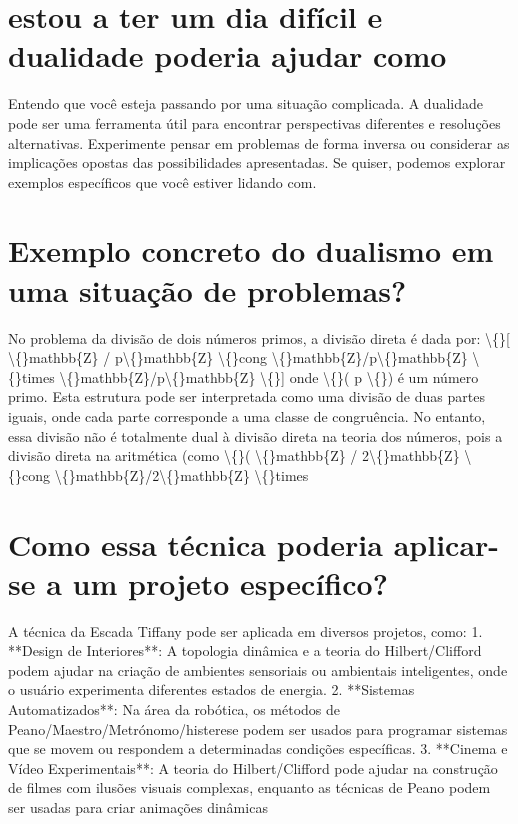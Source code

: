\documentclass[11pt,a4paper]{article}
\begin{document}
\section{estou a ter um dia difícil e dualidade poderia ajudar como}
Entendo que você esteja passando por uma situação complicada. A dualidade pode ser uma ferramenta útil para encontrar perspectivas diferentes e resoluções alternativas. Experimente pensar em problemas de forma inversa ou considerar as implicações opostas das possibilidades apresentadas. Se quiser, podemos explorar exemplos específicos que você estiver lidando com.

\section{Exemplo concreto do dualismo em uma situação de problemas?}
No problema da divisão de dois números primos, a divisão direta é dada por: \textbackslash\{\}[ \textbackslash\{\}mathbb\{Z\} / p\textbackslash\{\}mathbb\{Z\} \textbackslash\{\}cong \textbackslash\{\}mathbb\{Z\}/p\textbackslash\{\}mathbb\{Z\} \textbackslash\{\}times \textbackslash\{\}mathbb\{Z\}/p\textbackslash\{\}mathbb\{Z\} \textbackslash\{\}] onde \textbackslash\{\}( p \textbackslash\{\}) é um número primo. Esta estrutura pode ser interpretada como uma divisão de duas partes iguais, onde cada parte corresponde a uma classe de congruência. No entanto, essa divisão não é totalmente dual à divisão direta na teoria dos números, pois a divisão direta na aritmética (como \textbackslash\{\}( \textbackslash\{\}mathbb\{Z\} / 2\textbackslash\{\}mathbb\{Z\} \textbackslash\{\}cong \textbackslash\{\}mathbb\{Z\}/2\textbackslash\{\}mathbb\{Z\} \textbackslash\{\}times

\section{Como essa técnica poderia aplicar-se a um projeto específico?}
A técnica da Escada Tiffany pode ser aplicada em diversos projetos, como: 1. **Design de Interiores**: A topologia dinâmica e a teoria do Hilbert/Clifford podem ajudar na criação de ambientes sensoriais ou ambientais inteligentes, onde o usuário experimenta diferentes estados de energia. 2. **Sistemas Automatizados**: Na área da robótica, os métodos de Peano/Maestro/Metrónomo/histerese podem ser usados para programar sistemas que se movem ou respondem a determinadas condições específicas. 3. **Cinema e Vídeo Experimentais**: A teoria do Hilbert/Clifford pode ajudar na construção de filmes com ilusões visuais complexas, enquanto as técnicas de Peano podem ser usadas para criar animações dinâmicas
\end{document}
